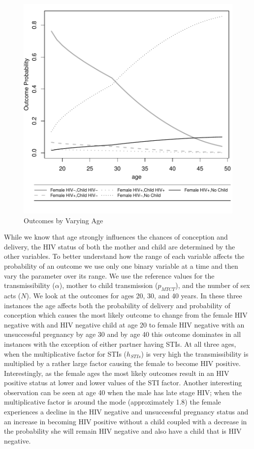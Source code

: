 \documentclass[11pt]{nih_mod}
\begin{document}
\begin{figure}[H]
  \begin{center}
    \includegraphics[width=5in]{figures/AgeVary_07Sept2012.pdf}
  \end{center}
  \caption{Outcomes by Varying Age}
  \label{Fig:AgeVary}
\end{figure}

While we know that age strongly influences the chances of conception and delivery, the HIV status of both the mother and child are determined by the other variables.  To better understand how the range of each variable affects the probability of an outcome we use only one binary variable at a time and then vary the parameter over its range.  We use the reference values for the transmissibility ($\alpha$), mother to child transmission ($p_{MTCT}$), and the number of sex acts ($N$).  We look at the outcomes for ages 20, 30, and 40 years.  In these three instances the age affects both the probability of delivery and probability of conception which causes the most likely outcome to change from the female HIV negative with and HIV negative child at age 20 to female HIV negative with an unsuccessful pregnancy by age 30 and by age 40 this outcome dominates in all instances with the exception of either partner having STIs.  At all three ages, when the multiplicative factor for STIs ($h_{STIs}$) is very high the transmissibility is multiplied by a rather large factor causing the female to become HIV positive.  Interestingly, as the female ages the most likely outcomes result in an HIV positive status at lower and lower values of the STI factor.  Another interesting observation can be seen at age 40 when the male has late stage HIV; when the multiplicative factor is around the mode (approximately 1.8) the female experiences a decline in the HIV negative and unsuccessful pregnancy status and an increase in becoming HIV positive without a child coupled with a decrease in the probability she will remain HIV negative and also have a child that is HIV negative. 
\end{document}
